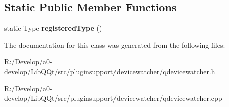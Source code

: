 \subsection*{Static Public Member Functions}
\begin{DoxyCompactItemize}
\item 
\mbox{\label{class_q_device_change_event_a2716270971e9094a7104e9e7de821617}} 
static Type {\bfseries registered\+Type} ()
\end{DoxyCompactItemize}


The documentation for this class was generated from the following files\+:\begin{DoxyCompactItemize}
\item 
R\+:/\+Develop/a0-\/develop/\+Lib\+Q\+Qt/src/pluginsupport/devicewatcher/qdevicewatcher.\+h\item 
R\+:/\+Develop/a0-\/develop/\+Lib\+Q\+Qt/src/pluginsupport/devicewatcher/qdevicewatcher.\+cpp\end{DoxyCompactItemize}
